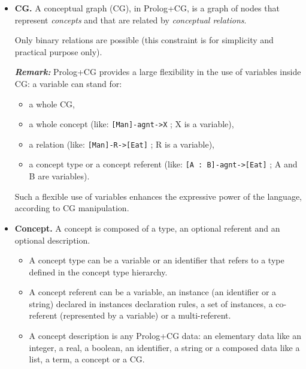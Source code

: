 \documentclass{book}
\begin{document}
\begin{itemize}

  \item {\bf CG.} A conceptual graph (CG), in Prolog+CG, is a graph of
nodes that represent {\it concepts} and that are related by {\it
conceptual relations}.

  Only binary relations are possible (this constraint is for
simplicity and practical purpose only).

{\it {\bf Remark:}} Prolog+CG provides a large
flexibility in the use of variables inside CG: a variable can stand
for:

 \begin{itemize}

  \item  a whole CG,

  \item a whole concept (like: {\tt [Man]-agnt->X} ; X is
a variable),

  \item a relation (like: {\tt [Man]-R->[Eat]} ; R is a
variable),

  \item a concept type or a concept referent (like: {\tt [A :
B]-agnt->[Eat]} ; A and B are variables).

\end{itemize}

Such a flexible use of variables enhances the expressive power of
the language, according to CG manipulation.



\item {\bf Concept.} A concept is composed of a type, an
optional referent and an optional description.

  \begin{itemize}

  \item A concept type can be a variable or an identifier that refers to
a type defined in the concept type hierarchy.

  \item A concept referent can be a variable, an instance (an identifier
or a string) declared in instances declaration rules, a set of
instances, a co-referent (represented by a variable) or a
multi-referent. 

  \item A concept description is any Prolog+CG data: an elementary data
like an integer, a real, a boolean, an identifier, a string or a
composed data like a list, a term, a concept or a CG.

\end{itemize}



\end{itemize}
\end{document}
